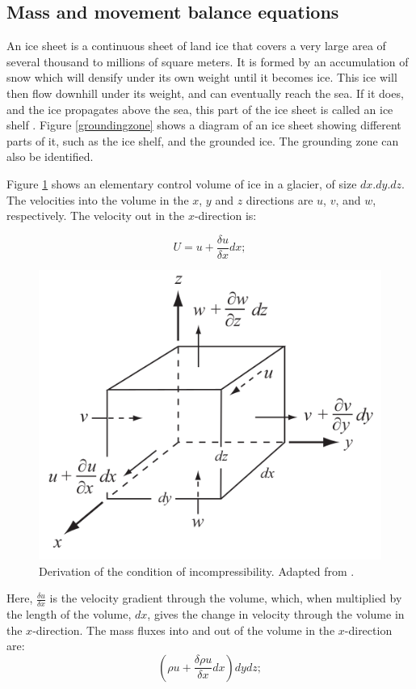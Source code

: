 \documentclass{article}
\begin{document}
\subsection{Mass and movement balance equations}
An ice sheet is a continuous sheet of land ice that covers a very large area of several thousand to millions of square meters. It is formed by an accumulation of snow which will densify under its own weight until it becomes ice. This ice will then flow downhill under its weight, and can eventually reach the sea. If it does, and the ice propagates above the sea, this part of the ice sheet is called an ice shelf \cite[]{hutter1982mathematical}. Figure \ref{groundingzone} shows a diagram of an ice sheet showing different parts of it, such as the ice shelf, and the grounded ice. The grounding zone can also be identified. 

Figure \ref{control_volume} shows an elementary control volume of ice in a glacier, of size $dx.dy.dz$. The velocities into the volume in the $x$, $y$ and $z$ directions are $u$, $v$, and $w$, respectively. The velocity out in the $x$-direction is:

\begin{equation}
	U = u+\frac{\delta u}{\delta x}dx;
\end{equation}

\begin{figure}[!h]
	\centering
	\includegraphics[width=0.5\linewidth]{../fig/Control_volume.png}
	\caption{Derivation of the condition of incompressibility. Adapted from \cite{hooke2019principles}.}
	\label{control_volume}
\end{figure}

Here, $\frac{\delta u}{\delta x}$ is the velocity gradient through the volume, which, when multiplied by the length of the volume, $dx$, gives the change in velocity through the volume in the $x$-direction. The mass fluxes into and out of the volume in the $x$-direction are:
\begin{equation}
	({\rho u + \frac{\delta \rho u}{\delta x}dx})dy dz;
\end{equation}
\end{document}
